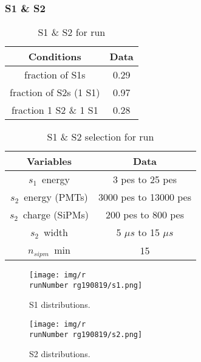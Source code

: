 \begin{frame}
\frametitle{S1 \& S2}

\begin{table}[h!]
\caption{S1 \& S2 for run \runNumber}
\begin{center}
\begin{tabular}{|c|c|}
\hline
Conditions & Data \\
\hline
fraction of S1s & 0.29 \\
fraction of S2s (1 S1) & 0.97 \\
fraction 1 S2 \& 1 S1 & 0.28 \\
\hline
\end{tabular}
\end{center}
\label{r\runNumber.data}
\end{table}%

\begin{table}[h!]
\caption{S1 \& S2 selection for run \runNumber}
\begin{center}
\begin{tabular}{|c|c|}
\hline
Variables & Data \\
\hline
$s_1$~energy & 3 pes to 25 pes \\
$s_2$~energy (PMTs) & 3000 pes to 13000 pes \\
$s_2$~charge (SiPMs) & 200 pes to 800 pes \\
$s_2$~width & 5 $\mu s$ to 15 $\mu s$ \\
$n_{sipm}$~min & 15\\
\hline
\end{tabular}
\end{center}
\label{r\runNumber.sel}
\end{table}%
\end{frame}


\begin{frame}
\begin{figure}
  \begin{center}
      \texttt{[image: img/r\\runNumber rg190819/s1.png]}
    \caption{S1 distributions.}
  \end{center}
\end{figure}
\end{frame}

\begin{frame}
\begin{figure}
  \begin{center}
      \texttt{[image: img/r\\runNumber rg190819/s2.png]}
    \caption{S2 distributions.}
  \end{center}
\end{figure}
\end{frame}

